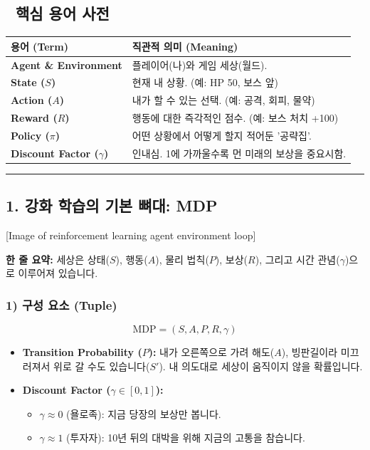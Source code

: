 \documentclass[11pt,a4paper]{book}
\theoremstyle{definition}
\begin{document}
\subsection*{📝 핵심 용어 사전}
\begin{table}[h]
\centering
\begin{tabular}{|p{}|p{}|}
\hline
\textbf{용어 (Term)} & \textbf{직관적 의미 (Meaning)} \\
\hline
\textbf{Agent \& Environment} & 플레이어(나)와 게임 세상(월드). \\
\hline
\textbf{State ($S$)} & 현재 내 상황. (예: HP 50, 보스 앞) \\
\hline
\textbf{Action ($A$)} & 내가 할 수 있는 선택. (예: 공격, 회피, 물약) \\
\hline
\textbf{Reward ($R$)} & 행동에 대한 즉각적인 점수. (예: 보스 처치 +100) \\
\hline
\textbf{Policy ($\pi$)} & 어떤 상황에서 어떻게 할지 적어둔 '공략집'. \\
\hline
\textbf{Discount Factor ($\gamma$)} & 인내심. 1에 가까울수록 먼 미래의 보상을 중요시함. \\
\hline
\end{tabular}
\end{table}

\vspace{0.5cm}\hrule\vspace{0.5cm}

\subsection{1. 강화 학습의 기본 뼈대: MDP}


[Image of reinforcement learning agent environment loop]


\begin{conceptbox}[title={개념 1: 세상을 정의하는 5가지 요소}]
\textbf{한 줄 요약:} 세상은 상태($S$), 행동($A$), 물리 법칙($P$), 보상($R$), 그리고 시간 관념($\gamma$)으로 이루어져 있습니다.
\end{conceptbox}

\subsubsection*{1) 구성 요소 (Tuple)}
$$ \text{MDP} = (S, A, P, R, \gamma) $$
\begin{itemize}
    \item \textbf{Transition Probability ($P$):} 내가 오른쪽으로 가려 해도($A$), 빙판길이라 미끄러져서 위로 갈 수도 있습니다($S'$). 내 의도대로 세상이 움직이지 않을 확률입니다.
    \item \textbf{Discount Factor ($\gamma \in [0, 1]$):}
    \begin{itemize}
        \item $\gamma \approx 0$ (욜로족): 지금 당장의 보상만 봅니다.
        \item $\gamma \approx 1$ (투자자): 10년 뒤의 대박을 위해 지금의 고통을 참습니다.
    \end{itemize}
\end{itemize}
\end{document}
